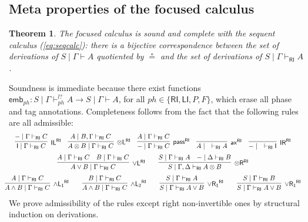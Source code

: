 \documentclass[submission,copyright,creativecommons]{eptcs}
\newtheorem{theorem}{Theorem}[section]
\theoremstyle{definition}
\newcommand{\tl}{\otimes \mathsf{L}}
\newcommand{\tr}{\otimes \mathsf{R}}
\newcommand{\pass}{\mathsf{pass}}
\newcommand{\unitl}{\mathsf{IL}}
\newcommand{\unitr}{\mathsf{IR}}
\newcommand{\andlone}{\land \mathsf{L_{1}}}
\newcommand{\andltwo}{\land \mathsf{L_{2}}}
\newcommand{\orl}{\lor \mathsf{L}}
\newcommand{\orrone}{\lor \mathsf{R_{1}}}
\newcommand{\ax}{\mathsf{ax}}
\newcommand{\ot}{\otimes}
\newcommand{\I}{\mathsf{I}}
\newcommand{\RI}{\mathsf{RI}}
\newcommand{\LI}{\mathsf{LI}}
\begin{document}
\subsection{Meta properties of the focused calculus}
\begin{theorem}\label{theorem:focus:sound:complete}
  The focused calculus is sound and complete with the sequent calculus (\ref{eq:seqcalc}): there is a bijective correspondence between the set of derivations of $S \mid \Gamma \vdash A$ quotiented by $\circeq$ and the set of derivations of $S \mid \Gamma \vdash_{\RI} A$.
\end{theorem}
Soundness is immediate because there exist functions $\mathsf{emb}_{ph} : S \mid \Gamma \vdash^{l?}_{ph} A \to S \mid \Gamma \vdash A$, for all $ph \in \{ \RI , \LI , P , F \}$, which erase all phase and tag annotations.
Completeness follows from the fact that the following rules are all admissible:
\begin{equation}\label{eq:admis}
  \hspace*{-4mm}
    \begin{array}{c}
      \infer[\unitl^{\RI}]{\I \mid \Gamma \vdash_{\RI} C}{{-} \mid \Gamma \vdash_{\RI} C}
      \quad
      \infer[\tl^{\RI}]{A \ot B \mid \Gamma \vdash_{\RI} C}{A \mid B, \Gamma \vdash_{\RI} C}
      \quad
      \infer[\pass^{\RI}]{{-} \mid \Gamma \vdash_{\RI} C}{A \mid \Gamma \vdash_{\RI} C}
      \quad
      \infer[\ax^{\RI}]{A \mid \quad \vdash_{\RI} A}{}
      \quad
      \infer[\unitr^{\RI}]{{-} \mid \quad \vdash_{\RI} \I}{}
  \\[6pt]
      \infer[\orl^{\RI}]{A \lor B \mid \Gamma \vdash_{\RI} C}{
      A \mid \Gamma \vdash_{\RI} C
      &
      B \mid \Gamma \vdash_{\RI} C
      }
      \qquad
      \infer[\tr^{\RI}]{S \mid \Gamma , \Delta \vdash_{\RI} A \ot B}{
        S \mid \Gamma \vdash_{\RI} A
        &
        {-} \mid \Delta \vdash_{\RI} B
      }
  \\[6pt]
      \infer[\andlone^{\RI}]{A \land B \mid \Gamma \vdash_{\RI} C}{A \mid \Gamma \vdash_{\RI} C}
      \qquad
      \infer[\andltwo^{\RI}]{A \land B \mid \Gamma \vdash_{\RI} C}{B \mid \Gamma \vdash_{\RI} C}
      \qquad
      \infer[\orrone^{\RI}]{S \mid \Gamma \vdash_{\RI} A \lor B}{S \mid \Gamma \vdash_{\RI} A}
      \qquad
      \infer[\orrone^{\RI}]{S \mid \Gamma \vdash_{\RI} A \lor B}{S \mid \Gamma \vdash_{\RI} B}
    \end{array}
  \end{equation}
We prove admissibility of the rules except right non-invertible ones by structural induction on derivations.
\end{document}
